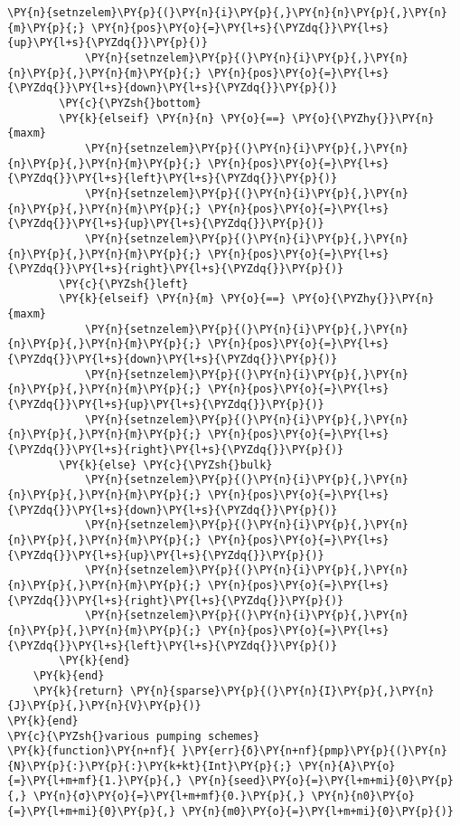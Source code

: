 \begin{Verbatim}[commandchars=\\\{\}]
            \PY{n}{setnzelem}\PY{p}{(}\PY{n}{i}\PY{p}{,}\PY{n}{n}\PY{p}{,}\PY{n}{m}\PY{p}{;} \PY{n}{pos}\PY{o}{=}\PY{l+s}{\PYZdq{}}\PY{l+s}{up}\PY{l+s}{\PYZdq{}}\PY{p}{)}
            \PY{n}{setnzelem}\PY{p}{(}\PY{n}{i}\PY{p}{,}\PY{n}{n}\PY{p}{,}\PY{n}{m}\PY{p}{;} \PY{n}{pos}\PY{o}{=}\PY{l+s}{\PYZdq{}}\PY{l+s}{down}\PY{l+s}{\PYZdq{}}\PY{p}{)}
        \PY{c}{\PYZsh{}bottom}
        \PY{k}{elseif} \PY{n}{n} \PY{o}{==} \PY{o}{\PYZhy{}}\PY{n}{maxm}
            \PY{n}{setnzelem}\PY{p}{(}\PY{n}{i}\PY{p}{,}\PY{n}{n}\PY{p}{,}\PY{n}{m}\PY{p}{;} \PY{n}{pos}\PY{o}{=}\PY{l+s}{\PYZdq{}}\PY{l+s}{left}\PY{l+s}{\PYZdq{}}\PY{p}{)}
            \PY{n}{setnzelem}\PY{p}{(}\PY{n}{i}\PY{p}{,}\PY{n}{n}\PY{p}{,}\PY{n}{m}\PY{p}{;} \PY{n}{pos}\PY{o}{=}\PY{l+s}{\PYZdq{}}\PY{l+s}{up}\PY{l+s}{\PYZdq{}}\PY{p}{)}
            \PY{n}{setnzelem}\PY{p}{(}\PY{n}{i}\PY{p}{,}\PY{n}{n}\PY{p}{,}\PY{n}{m}\PY{p}{;} \PY{n}{pos}\PY{o}{=}\PY{l+s}{\PYZdq{}}\PY{l+s}{right}\PY{l+s}{\PYZdq{}}\PY{p}{)}
        \PY{c}{\PYZsh{}left}
        \PY{k}{elseif} \PY{n}{m} \PY{o}{==} \PY{o}{\PYZhy{}}\PY{n}{maxm}
            \PY{n}{setnzelem}\PY{p}{(}\PY{n}{i}\PY{p}{,}\PY{n}{n}\PY{p}{,}\PY{n}{m}\PY{p}{;} \PY{n}{pos}\PY{o}{=}\PY{l+s}{\PYZdq{}}\PY{l+s}{down}\PY{l+s}{\PYZdq{}}\PY{p}{)}
            \PY{n}{setnzelem}\PY{p}{(}\PY{n}{i}\PY{p}{,}\PY{n}{n}\PY{p}{,}\PY{n}{m}\PY{p}{;} \PY{n}{pos}\PY{o}{=}\PY{l+s}{\PYZdq{}}\PY{l+s}{up}\PY{l+s}{\PYZdq{}}\PY{p}{)}
            \PY{n}{setnzelem}\PY{p}{(}\PY{n}{i}\PY{p}{,}\PY{n}{n}\PY{p}{,}\PY{n}{m}\PY{p}{;} \PY{n}{pos}\PY{o}{=}\PY{l+s}{\PYZdq{}}\PY{l+s}{right}\PY{l+s}{\PYZdq{}}\PY{p}{)}
        \PY{k}{else} \PY{c}{\PYZsh{}bulk}
            \PY{n}{setnzelem}\PY{p}{(}\PY{n}{i}\PY{p}{,}\PY{n}{n}\PY{p}{,}\PY{n}{m}\PY{p}{;} \PY{n}{pos}\PY{o}{=}\PY{l+s}{\PYZdq{}}\PY{l+s}{down}\PY{l+s}{\PYZdq{}}\PY{p}{)}
            \PY{n}{setnzelem}\PY{p}{(}\PY{n}{i}\PY{p}{,}\PY{n}{n}\PY{p}{,}\PY{n}{m}\PY{p}{;} \PY{n}{pos}\PY{o}{=}\PY{l+s}{\PYZdq{}}\PY{l+s}{up}\PY{l+s}{\PYZdq{}}\PY{p}{)}
            \PY{n}{setnzelem}\PY{p}{(}\PY{n}{i}\PY{p}{,}\PY{n}{n}\PY{p}{,}\PY{n}{m}\PY{p}{;} \PY{n}{pos}\PY{o}{=}\PY{l+s}{\PYZdq{}}\PY{l+s}{right}\PY{l+s}{\PYZdq{}}\PY{p}{)}
            \PY{n}{setnzelem}\PY{p}{(}\PY{n}{i}\PY{p}{,}\PY{n}{n}\PY{p}{,}\PY{n}{m}\PY{p}{;} \PY{n}{pos}\PY{o}{=}\PY{l+s}{\PYZdq{}}\PY{l+s}{left}\PY{l+s}{\PYZdq{}}\PY{p}{)}
        \PY{k}{end}
    \PY{k}{end}
    \PY{k}{return} \PY{n}{sparse}\PY{p}{(}\PY{n}{I}\PY{p}{,}\PY{n}{J}\PY{p}{,}\PY{n}{V}\PY{p}{)}
\PY{k}{end}
\PY{c}{\PYZsh{}various pumping schemes}
\PY{k}{function}\PY{n+nf}{ }\PY{err}{δ}\PY{n+nf}{pmp}\PY{p}{(}\PY{n}{N}\PY{p}{:}\PY{p}{:}\PY{k+kt}{Int}\PY{p}{;} \PY{n}{A}\PY{o}{=}\PY{l+m+mf}{1.}\PY{p}{,} \PY{n}{seed}\PY{o}{=}\PY{l+m+mi}{0}\PY{p}{,} \PY{n}{σ}\PY{o}{=}\PY{l+m+mf}{0.}\PY{p}{,} \PY{n}{n0}\PY{o}{=}\PY{l+m+mi}{0}\PY{p}{,} \PY{n}{m0}\PY{o}{=}\PY{l+m+mi}{0}\PY{p}{)}

\end{Verbatim}
